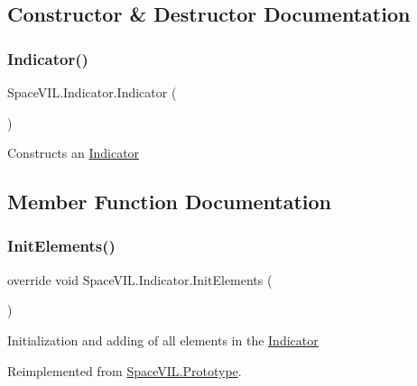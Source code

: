 \subsection{Constructor \& Destructor Documentation}
\mbox{\label{class_space_v_i_l_1_1_indicator_a2601a19d889e39b36100e015843001c8}} 
\subsubsection{\texorpdfstring{Indicator()}{Indicator()}}
{\footnotesize\ttfamily Space\+V\+I\+L.\+Indicator.\+Indicator (\begin{DoxyParamCaption}{ }\end{DoxyParamCaption})}



Constructs an \mbox{\hyperlink{class_space_v_i_l_1_1_indicator}{Indicator}} 



\subsection{Member Function Documentation}
\mbox{\label{class_space_v_i_l_1_1_indicator_a787de3f581ef112a306781a4a9722fb5}} 
\subsubsection{\texorpdfstring{Init\+Elements()}{InitElements()}}
{\footnotesize\ttfamily override void Space\+V\+I\+L.\+Indicator.\+Init\+Elements (\begin{DoxyParamCaption}{ }\end{DoxyParamCaption})\hspace{0.3cm}{\ttfamily [virtual]}}



Initialization and adding of all elements in the \mbox{\hyperlink{class_space_v_i_l_1_1_indicator}{Indicator}} 



Reimplemented from \mbox{\hyperlink{class_space_v_i_l_1_1_prototype_ac3379fe02923ee155b5b0084abf27420}{Space\+V\+I\+L.\+Prototype}}.

